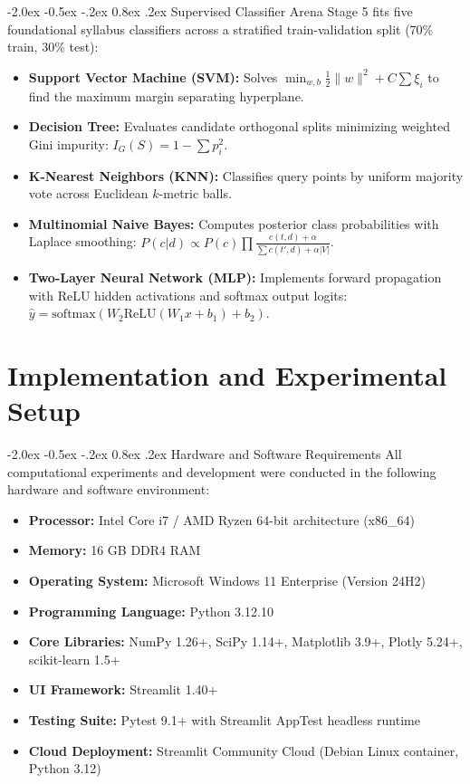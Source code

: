 \documentclass[12pt,a4paper]{report}
\makeatletter
\newenvironment{tightitemize}{%
  \begin{itemize}%
    \setlength{\itemsep}{1.5pt}%
    \setlength{\parskip}{0pt}%
    \setlength{\parsep}{0pt}%
}{%
  \end{itemize}%
}
\renewcommand\section{\@startsection {section}{1}{\z@}%
                                   {-2.0ex \@plus -0.5ex \@minus -.2ex}%
                                   {0.8ex \@plus.2ex}%
                                   {\normalfont\fontsize{14}{17}\bfseries\color{headerblue}}}
\makeatother
\begin{document}
\section{Supervised Classifier Arena}
Stage 5 fits five foundational syllabus classifiers across a stratified train-validation split (70\% train, 30\% test):
\begin{tightitemize}
    \item \textbf{Support Vector Machine (SVM):} Solves $\min_{w, b} \frac{1}{2}\|w\|^2 + C \sum \xi_i$ to find the maximum margin separating hyperplane.
    \item \textbf{Decision Tree:} Evaluates candidate orthogonal splits minimizing weighted Gini impurity: $I_G(S) = 1 - \sum p_i^2$.
    \item \textbf{K-Nearest Neighbors (KNN):} Classifies query points by uniform majority vote across Euclidean $k$-metric balls.
    \item \textbf{Multinomial Naive Bayes:} Computes posterior class probabilities with Laplace smoothing: $P(c|d) \propto P(c) \prod \frac{c(t, d) + \alpha}{\sum c(t', d) + \alpha |V|}$.
    \item \textbf{Two-Layer Neural Network (MLP):} Implements forward propagation with ReLU hidden activations and softmax output logits: $\hat{y} = \text{softmax}(W_2 \text{ReLU}(W_1 x + b_1) + b_2)$.
\end{tightitemize}

\chapter{Implementation and Experimental Setup}

\section{Hardware and Software Requirements}
All computational experiments and development were conducted in the following hardware and software environment:
\begin{tightitemize}
    \item \textbf{Processor:} Intel Core i7 / AMD Ryzen 64-bit architecture (x86\_64)
    \item \textbf{Memory:} 16 GB DDR4 RAM
    \item \textbf{Operating System:} Microsoft Windows 11 Enterprise (Version 24H2)
    \item \textbf{Programming Language:} Python 3.12.10
    \item \textbf{Core Libraries:} NumPy 1.26+, SciPy 1.14+, Matplotlib 3.9+, Plotly 5.24+, scikit-learn 1.5+
    \item \textbf{UI Framework:} Streamlit 1.40+
    \item \textbf{Testing Suite:} Pytest 9.1+ with Streamlit AppTest headless runtime
    \item \textbf{Cloud Deployment:} Streamlit Community Cloud (Debian Linux container, Python 3.12)
\end{tightitemize}
\end{document}
